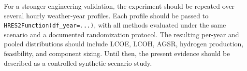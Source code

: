 For a stronger engineering validation, the experiment should be repeated over
several hourly weather-year profiles. Each profile should be passed to
\texttt{HRES2Function(df\_year=...)}, with all methods evaluated under the same
scenario and a documented randomization protocol. The resulting per-year and
pooled distributions should include LCOE, LCOH, AGSR, hydrogen production,
feasibility, and component sizing. Until then, the present evidence should be
described as a controlled synthetic-scenario study.

